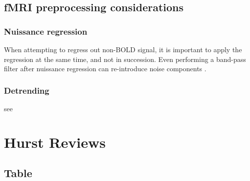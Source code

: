 \documentclass[
  sn-vancouver,
  Numbered,
  referee,
  lineno]{sn-jnl}
\begin{document}
\subsection{fMRI preprocessing
considerations}\label{fmri-preprocessing-considerations}

\subsubsection{Nuissance regression}\label{nuissance-regression}

When attempting to regress out non-BOLD signal, it is important to apply
the regression at the same time, and not in succession. Even performing
a band-pass filter after nuissance regression can re-introduce noise
components \citep{lindquistModularPreprocessingPipelines2019}.

\subsubsection{Detrending}\label{detrending}

see \citet{tanabeComparisonDetrendingMethods2002}

\section{Hurst Reviews}\label{hurst-reviews}

\subsection{Table}\label{table}
\end{document}

